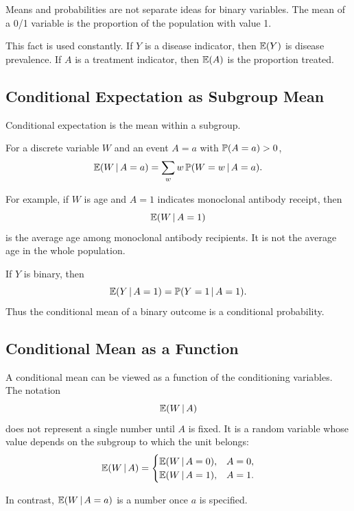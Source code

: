 \begin{keyidea}
Means and probabilities are not separate ideas for binary variables. The mean of a 0/1 variable is the proportion of the population with value 1.
\end{keyidea}

This fact is used constantly. If $Y$ is a disease indicator, then $\mathbb{E}(Y)$ is disease prevalence. If $A$ is a treatment indicator, then $\mathbb{E}(A)$ is the proportion treated.

\subsection{Conditional Expectation as Subgroup Mean}

Conditional expectation is the mean within a subgroup.

\begin{definition}
For a discrete variable $W$ and an event $A=a$ with $\mathbb{P}(A=a)>0$,
\[
\mathbb{E}(W\,\vert\, A=a)=\sum_w w\,\mathbb{P}(W=w\,\vert\, A=a).
\]
\end{definition}

For example, if $W$ is age and $A=1$ indicates monoclonal antibody receipt, then
\[
\mathbb{E}(W\,\vert\, A=1)
\]
is the average age among monoclonal antibody recipients. It is not the average age in the whole population.

If $Y$ is binary, then
\[
\mathbb{E}(Y\,\vert\, A=1)=\mathbb{P}(Y=1\,\vert\, A=1).
\]
Thus the conditional mean of a binary outcome is a conditional probability.

\subsection{Conditional Mean as a Function}

A conditional mean can be viewed as a function of the conditioning variables. The notation
\[
\mathbb{E}(W\,\vert\, A)
\]
does not represent a single number until $A$ is fixed. It is a random variable whose value depends on the subgroup to which the unit belongs:
\[
\mathbb{E}(W\,\vert\, A)
=
\begin{cases}
\mathbb{E}(W\,\vert\, A=0), & A=0,\\
\mathbb{E}(W\,\vert\, A=1), & A=1.
\end{cases}
\]

In contrast, $\mathbb{E}(W\,\vert\, A=a)$ is a number once $a$ is specified.

